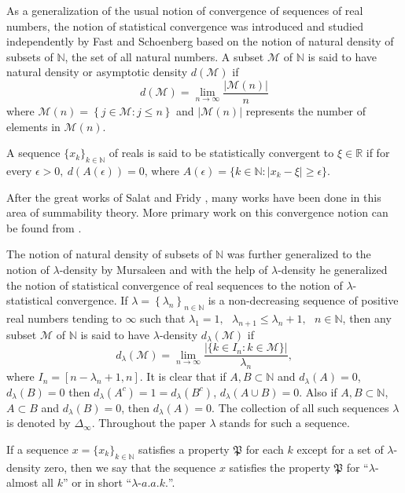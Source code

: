 \documentclass[reqno,b5paper]{amsart}
\theoremstyle{plain}
\theoremstyle{definition}
\begin{document}
As a generalization of the usual notion of convergence of
sequences of real numbers, the notion of statistical convergence
was introduced and studied independently by Fast \cite{Fa} and
Schoenberg \cite{Sc} based on the notion of natural density of
subsets of $\mathbb N$, the set of all natural numbers. A subset
$\mathcal{M}$ of $\mathbb N$ is said to have natural density or
asymptotic density $d(\mathcal{M})$ if
$$d(\mathcal{M})=\lim\limits_{n\rightarrow \infty}\frac{\left|\mathcal{M}(n)\right|}{n}$$
where $\mathcal{M}(n)=\left\{j\in \mathcal{M}:j\leq n\right\}$ and
 $\left|\mathcal{M}(n)\right|$ represents the number of elements in
 $\mathcal{M}(n)$.

A sequence $\{x_k\}_{k\in\mathbb{N}}$ of reals is said to be
statistically convergent to $\xi\in\mathbb{R}$ if for every
$\epsilon>0,~d(A(\epsilon))=0$, where
$A(\epsilon)=\{k\in\mathbb{N}:\left|x_k-\xi\right|\geq\epsilon\}$.

After the great works of Salat \cite{Sa} and Fridy \cite{Fr1},
many works have been done in this area of summability theory. More
primary work on this convergence notion can be found from
\cite{Co1, Co2, Co3,Fr2, Fr3, Pe, St}.

The notion of natural density of subsets of $\mathbb{N}$ was
further generalized to the notion of $\lambda$-density by
Mursaleen \cite{M} and with the help of $\lambda$-density he
generalized the notion of statistical convergence of real
sequences to the notion of $\lambda$-statistical convergence. If
$\lambda=\left\{\lambda_n\right\}_{n\in\mathbb N}$ is a
non-decreasing sequence of positive real numbers tending to
$\infty$ such that
$\lambda_1=1,~~~\lambda_{n+1}\leq\lambda_n+1,~~~n\in\mathbb N$,
then any subset $\mathcal{M}$ of $\mathbb{N}$ is said to have
$\lambda$-density $d_\lambda(\mathcal{M})$ if
$$d_\lambda(\mathcal{M})=\lim\limits_{n\rightarrow\infty}\frac{\left|\{k\in I_n: k\in \mathcal{M}\}\right|}{\lambda_n},$$
where $I_n=[n-\lambda_n + 1,n]$. It is clear that if
$A,B\subset\mathbb{N}$ and $d_\lambda(A)=0$, $d_\lambda(B)=0$ then
$d_\lambda(A^c)=1=d_\lambda(B^c)$, $d_\lambda(A\cup B)=0$. Also if
$A,B\subset\mathbb{N}$, $A\subset B$ and $d_\lambda(B)=0$, then
$d_\lambda(A)=0$. The collection of all such sequences $\lambda$
is denoted by $\Delta_\infty$. Throughout the paper $\lambda$
stands for such a sequence.

If a sequence $x=\{x_k\}_{k \in \mathbb{N}}$ satisfies a property
$\mathfrak{P}$ for each $k$ except for a set of $\lambda$-density
zero, then we say that the sequence $x$ satisfies the property
$\mathfrak{P}$ for ``$\lambda$-almost all $k$'' or in short
``$\lambda\mbox{-}a.a.k.$''.
\end{document}
